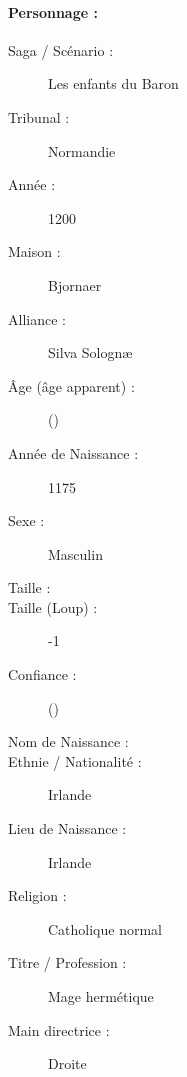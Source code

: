 \pagestyle{fancy}
\thispagestyle{plain}
{\Large \paragraph*{\Large Personnage :} \magusname}
\begin{multicols}{2}
\begin{description}
\item[Saga / Scénario :] Les enfants du Baron
\item[Tribunal :] Normandie
\item[Année :] 1200
\item[Maison :] Bjornaer
\item[Alliance :] Silva Solognæ
\item[Âge (âge apparent) :] \magusage{} (\magusapparentage)
\item[Année de Naissance :] 1175
\item[Sexe :] Masculin
\item[Taille :] \magussize
\item[Taille (Loup) :] -1
\item[Confiance :] \magusconfidencescore{} (\magusconfidencepts)
\columnbreak
\item[Nom de Naissance :] \magusbirthname
\item[Ethnie /  Nationalité :] Irlande
\item[Lieu de Naissance :] Irlande
\item[Religion :] Catholique normal
\item[Titre / Profession :] Mage hermétique
\item[Main directrice :] Droite
\vspace{-1em}
\end{description}
\end{multicols}
